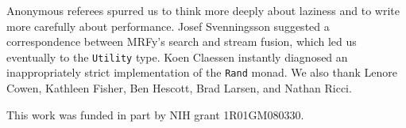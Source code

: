 \documentclass[preprint,nonatbib,blockstyle,times]{sigplanconf}
\newcommand\mrfy{MRFy} %
\begin{document}
%  

 

\acks

Anonymous referees spurred us to think
more deeply about laziness and to write more carefully about performance.
Josef Svenningsson suggested a correspondence between \mrfy's search
and stream fusion, which led us eventually to the \texttt{Utility} type.
Koen Claessen instantly diagnosed an inappropriately strict
implementation of the \texttt{Rand} monad.
We also thank Lenore Cowen, Kathleen Fisher, Ben Hescott, Brad
Larsen, and Nathan Ricci.

This work was funded in part by NIH grant 1R01GM080330.




\iffalse

\else
\end{document}
